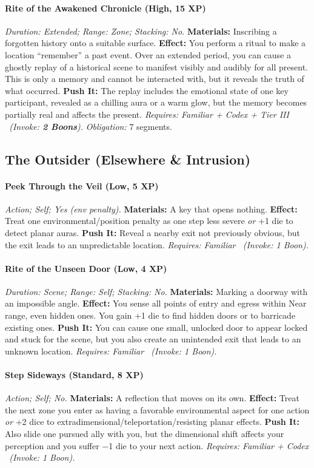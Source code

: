 \paragraph{Rite of the Awakened Chronicle (High, 15 XP)} \emph{Duration: Extended; Range: Zone; Stacking: No.}
\textbf{Materials:} Inscribing a forgotten history onto a suitable surface.
\textbf{Effect:} You perform a ritual to make a location ``remember'' a past event. Over an extended period, you can cause a ghostly replay of a historical scene to manifest visibly and audibly for all present. This is only a memory and cannot be interacted with, but it reveals the truth of what occurred.
\textbf{Push It:} The replay includes the emotional state of one key participant, revealed as a chilling aura or a warm glow, but the memory becomes partially real and affects the present.
\emph{Requires: Familiar + Codex + Tier III \ (\textit{Invoke:} \textbf{2 Boons}).}
\emph{Obligation:} 7 segments.

\subsection{The Outsider (Elsewhere \& Intrusion)}
\paragraph{Peek Through the Veil (Low, 5 XP)} \emph{Action; Self; Yes (env penalty).}
\textbf{Materials:} A key that opens nothing.
\textbf{Effect:} Treat one environmental/position penalty as one step less severe \emph{or} +1 die to detect planar auras.
\textbf{Push It:} Reveal a nearby exit not previously obvious, but the exit leads to an unpredictable location.
\emph{Requires: Familiar \ (\textit{Invoke:} 1 Boon).}
\paragraph{Rite of the Unseen Door (Low, 4 XP)} \emph{Duration: Scene; Range: Self; Stacking: No.}
\textbf{Materials:} Marking a doorway with an impossible angle.
\textbf{Effect:} You sense all points of entry and egress within Near range, even hidden ones. You gain +1 die to find hidden doors or to barricade existing ones.
\textbf{Push It:} You can cause one small, unlocked door to appear locked and stuck for the scene, but you also create an unintended exit that leads to an unknown location.
\emph{Requires: Familiar \ (\textit{Invoke:} 1 Boon).}
\paragraph{Step Sideways (Standard, 8 XP)} \emph{Action; Self; No.}
\textbf{Materials:} A reflection that moves on its own.
\textbf{Effect:} Treat the next zone you enter as having a favorable environmental aspect for one action \emph{or} +2 dice to extradimensional/teleportation/resisting planar effects.
\textbf{Push It:} Also slide one pursued ally with you, but the dimensional shift affects your perception and you suffer −1 die to your next action.
\emph{Requires: Familiar + Codex \ (\textit{Invoke:} 1 Boon).}


